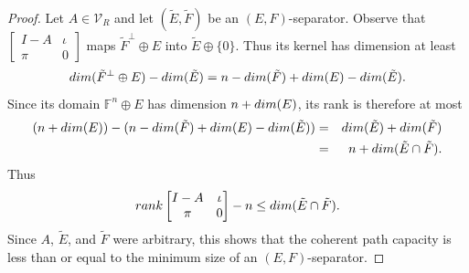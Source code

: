 \documentclass[10pt,a4paper]{amsart}
\begin{document}
\begin{proof}
Let $A \in \mathcal{V}_R$ and let $(\tilde{E}, \tilde{F})$ be an $(E,F)$-separator. Observe that $\left[\begin{matrix}I - A& \iota\\ \pi&0\end{matrix}\right]$ maps $\tilde{F}^\perp \oplus E$ into $\tilde{E} \oplus \{0\}$. Thus its kernel has dimension at least $${\rm dim}(\tilde{F}^\perp \oplus E) - {\rm dim}(\tilde{E}) = n - {\rm dim}(\tilde{F}) + {\rm dim}(E) - {\rm dim}(\tilde{E}).$$ Since its domain $\mathbb{F}^n \oplus E$ has dimension $n + {\rm dim}(E)$, its rank is therefore at most
\begin{eqnarray*}(n + {\rm dim}(E)) - (n - {\rm dim}(\tilde{F}) + {\rm dim}(E) - {\rm dim}(\tilde{E})) &=& {\rm dim}(\tilde{E}) + {\rm dim}(\tilde{F})\\ &=& n + {\rm dim}(\tilde{E} \cap \tilde{F}).\end{eqnarray*} Thus $${\rm rank}\left[\begin{matrix}I - A& \iota\\ \pi&0\end{matrix}\right] - n \leq {\rm dim}(\tilde{E} \cap \tilde{F}).$$ Since $A$, $\tilde{E}$, and $\tilde{F}$ were arbitrary, this shows that the coherent path capacity is less than or equal to the minimum size of an $(E,F)$-separator.


\end{proof}
\end{document}
